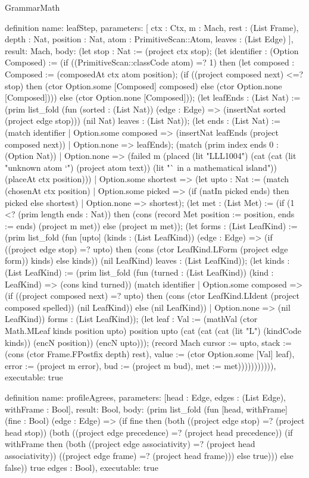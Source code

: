 \begin{lexlean}{GrammarMath}
\begin{semanticmodule}
{{{definition{
  name: leafStep,
  parameters: [
    ctx : Ctx,
    m : Mach,
    rest : (List Frame),
    depth : Nat,
    position : Nat,
    atom : PrimitiveScan::Atom,
    leaves : (List Edge)
  ],
  result: Mach,
  body: (let stop : Nat := (project ctx stop); (let identifier : (Option Composed) := (if ((PrimitiveScan::classCode atom) =? 1) then (let composed : Composed := (composedAt ctx atom position); (if ((project composed next) <=? stop) then (ctor Option.some [Composed] composed) else (ctor Option.none [Composed]))) else (ctor Option.none [Composed])); (let leafEnds : (List Nat) := (prim list_fold (fun (sorted : (List Nat)) (edge : Edge) => (insertNat sorted (project edge stop))) (nil Nat) leaves : (List Nat)); (let ends : (List Nat) := (match identifier
    | Option.some composed => (insertNat leafEnds (project composed next))
    | Option.none => leafEnds); (match (prim index ends 0 : (Option Nat))
    | Option.none => (failed m (placed (lit "LLL1004") (cat (cat (lit "unknown atom `") (project atom text)) (lit "` in a mathematical island")) (placeAt ctx position)))
    | Option.some shortest => (let upto : Nat := (match (chosenAt ctx position)
      | Option.some picked => (if (natIn picked ends) then picked else shortest)
      | Option.none => shortest); (let met : (List Met) := (if (1 <? (prim length ends : Nat)) then (cons (record Met {position := position, ends := ends}) (project m met)) else (project m met)); (let forms : (List LeafKind) := (prim list_fold (fun [upto] (kinds : (List LeafKind)) (edge : Edge) => (if ((project edge stop) =? upto) then (cons (ctor LeafKind.LForm (project edge form)) kinds) else kinds)) (nil LeafKind) leaves : (List LeafKind)); (let kinds : (List LeafKind) := (prim list_fold (fun (turned : (List LeafKind)) (kind : LeafKind) => (cons kind turned)) (match identifier
      | Option.some composed => (if ((project composed next) =? upto) then (cons (ctor LeafKind.LIdent (project composed spelled)) (nil LeafKind)) else (nil LeafKind))
      | Option.none => (nil LeafKind)) forms : (List LeafKind)); (let leaf : Val := (mathVal (ctor Math.MLeaf kinds position upto) position upto (cat (cat (cat (lit "L") (kindCode kinds)) (encN position)) (encN upto))); (record Mach {cursor := upto, stack := (cons (ctor Frame.FPostfix depth) rest), value := (ctor Option.some [Val] leaf), error := (project m error), bud := (project m bud), met := met}))))))))))),
  executable: true
}

definition{
  name: profileAgrees,
  parameters: [head : Edge, edges : (List Edge), withFrame : Bool],
  result: Bool,
  body: (prim list_fold (fun [head, withFrame] (fine : Bool) (edge : Edge) => (if fine then (both ((project edge stop) =? (project head stop)) (both ((project edge precedence) =? (project head precedence)) (if withFrame then (both ((project edge associativity) =? (project head associativity)) ((project edge frame) =? (project head frame))) else true))) else false)) true edges : Bool),
  executable: true
}

}}}
\end{semanticmodule}
\end{lexlean}
